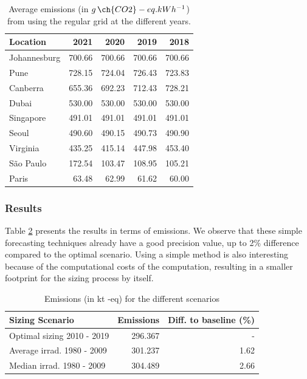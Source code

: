 \begin{table}
  
  \caption{Average emissions (in $g\,\ch{CO2}-eq.kWh^{-1}$) from using the regular grid at the different years.}\label{tab:carbonfootprint} \centering
  \begin{tabular}{|l|r|r|r|r|}    
  \hline   
  \textbf{Location} &  \textbf{2021} & \textbf{2020} & \textbf{2019} & \textbf{2018}\\
  \hline
  Johannesburg & 700.66 & 700.66 & 700.66 & 700.66  \\
  \hline
  Pune & 728.15 & 724.04 & 726.43 & 723.83     \\
  \hline
  Canberra & 655.36 & 692.23 & 712.43 & 728.21\\
  \hline
  Dubai & 530.00  & 530.00 & 530.00 & 530.00     \\
  \hline
  Singapore & 491.01 & 491.01 & 491.01 & 491.01 \\
  \hline     
  Seoul & 490.60 & 490.15 & 490.73 & 490.90     \\
  \hline
  Virginia  & 435.25 & 415.14 & 447.98 & 453.40 \\
  \hline
  São Paulo &  172.54 &  103.47 & 108.95 &  105.21 \\
  \hline 
  Paris &  63.48  & 62.99 & 61.62   & 60.00   \\
  \hline  

\end{tabular}  
\end{table}


\subsubsection{Results}

Table \ref{tab:co2_10y} presents the results in terms of  emissions. We observe that these simple forecasting techniques already have a good precision value, up to 2\% difference compared to the optimal scenario. Using a simple method is also interesting because of the computational costs of the computation, resulting in a smaller  footprint for the sizing process by itself.

\begin{table}
  \caption{Emissions (in kt -eq) for the different scenarios} \centering
    \label{tab:co2_10y}
      \begin{tabular}{|l|r|r|}        
        \hline        
        \textbf{Sizing Scenario} &  \textbf{Emissions } & \textbf{Diff. to baseline (\%) } \\
        \hline        
        Optimal sizing 2010 - 2019  &       296.367 & - \\
        \hline     
        Average irrad.  1980 - 2009  & 301.237 &  1.62 \\
        \hline
        Median irrad. 1980 - 2009  &        304.489 & 2.66 \\
        \hline        
      \end{tabular}      
    \end{table}
   

